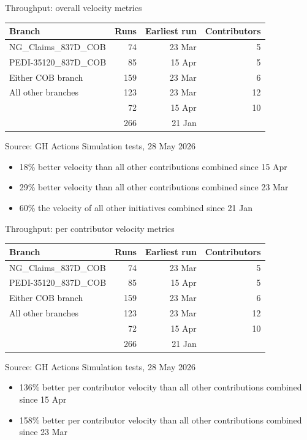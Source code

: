 \documentclass{beamer}
\begin{document}
	\begin{frame}{Throughput: overall velocity metrics}
		\begin{center}
			\begin{tabular}{ lrrr }
				Branch & Runs & Earliest run & Contributors \\ \hline
				NG\_Claims\_837D\_COB & 74 & 23 Mar & 5 \\ \hline
				PEDI-35120\_837D\_COB & 85 & 15 Apr & 5 \\ \hline
				Either COB branch & 159 & 23 Mar & 6 \\ \hline
				All other branches & 123 & 23 Mar & 12 \\ \hline
				& 72 & 15 Apr & 10 \\ \hline
				& 266 & 21 Jan & \\ \hline
			\end{tabular}
			Source: GH Actions Simulation tests, 28 May 2026
		\end{center}
		
		\pause
		\begin{itemize}
			\item 18\% better velocity than all other contributions combined since 15 Apr \pause
			\item 29\% better velocity than all other contributions combined since 23 Mar \pause
			\item 60\% the velocity of all other initiatives combined since 21 Jan \pause
		\end{itemize}
	\end{frame}
	\begin{frame}{Throughput: per contributor velocity metrics}
		\begin{center}
			\begin{tabular}{ lrrr }
				Branch & Runs & Earliest run & Contributors \\ \hline
				NG\_Claims\_837D\_COB & 74 & 23 Mar & 5 \\ \hline
				PEDI-35120\_837D\_COB & 85 & 15 Apr & 5 \\ \hline
				Either COB branch & 159 & 23 Mar & 6 \\ \hline
				All other branches & 123 & 23 Mar & 12 \\ \hline
				& 72 & 15 Apr & 10 \\ \hline
				& 266 & 21 Jan & \\ \hline
			\end{tabular}
			Source: GH Actions Simulation tests, 28 May 2026
		\end{center}
		\pause
		\begin{itemize}
			\item 136\% better per contributor velocity than all other contributions combined since 15 Apr \pause
			\item 158\% better per contributor velocity than all other contributions combined since 23 Mar \pause
		\end{itemize}
	\end{frame}
\end{document}
